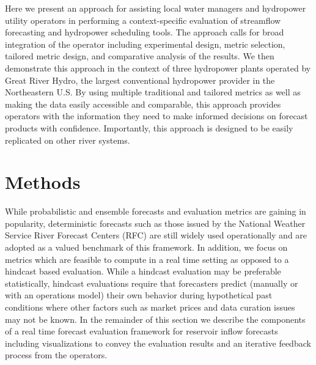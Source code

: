 \documentclass[MLA,Times1COL, hidelinks, doublespace]{WileyNJDv5} %
\begin{document}
Here we present an approach for assisting local water managers and hydropower utility operators in performing a context-specific evaluation of streamflow forecasting and hydropower scheduling tools. The approach calls for broad integration of the operator including experimental design, metric selection, tailored metric design, and comparative analysis of the results. We then demonstrate this approach in the context of three hydropower plants operated by Great River Hydro, the largest conventional hydropower provider in the Northeastern U.S. By using multiple traditional and tailored metrics as well as making the data easily accessible and comparable, this approach provides operators with the information they need to make informed decisions on forecast products with confidence. Importantly, this approach is designed to be easily replicated on other river systems.


\section{Methods}

While probabilistic and ensemble forecasts and evaluation metrics are gaining in popularity, deterministic forecasts such as those issued by the National Weather Service River Forecast Centers (RFC) are still widely used operationally and are adopted as a valued benchmark of this framework. In addition, we focus on metrics which are feasible to compute in a real time setting as opposed to a hindcast based evaluation. While a hindcast evaluation may be preferable statistically, hindcast evaluations require that forecasters predict (manually or with an operations model) their own behavior during hypothetical past conditions where other factors such as market prices and data curation issues may not be known. In the remainder of this section we describe the components of a real time forecast evaluation framework for reservoir inflow forecasts including visualizations to convey the evaluation results and an iterative feedback process from the operators. 
\end{document}
